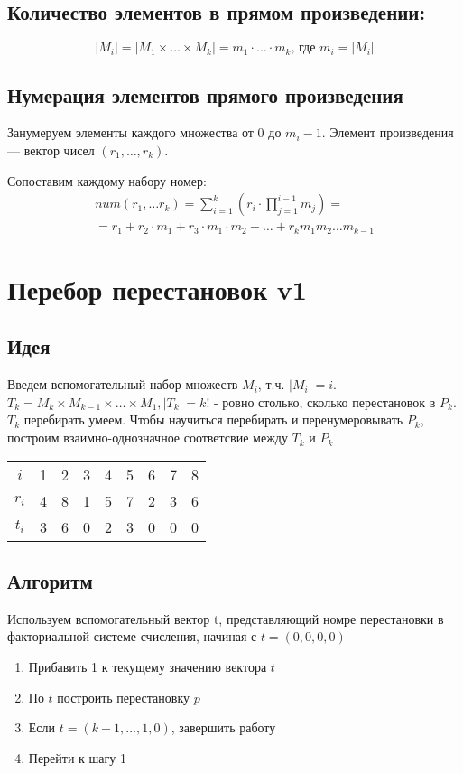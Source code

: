 \documentclass[main]{subfiles}
\begin{document}
\subsection{Количество элементов в прямом произведении:}
\[
    |M_i| = |M_1 \times \ldots \times M_k| = m_1 \cdot \ldots \cdot m_k 
    \text{, где $m_i=|M_i|$}
\]

\subsection{Нумерация элементов прямого произведения}
Занумеруем элементы каждого множества от 0 до $m_i - 1$. Элемент произведения ---
вектор чисел $(r_1, \ldots, r_k)$.

Сопоставим каждому набору номер:
\begin{multline}
    num(r_1, \ldots r_k) = \sum_{i = 1}^{k}\left(r_i \cdot \prod\limits_{j=1}^{i-1}m_j\right) = \\
    = r_1 + r_2 \cdot m_1 + r_3 \cdot m_1 \cdot m_2 + \ldots + r_k m_1 m_2 \ldots m_{k-1}
\end{multline}

\section{Перебор перестановок v1}
\subsection{Идея}
Введем вспомогательный набор множеств $M_i$, т.ч. $|M_i| = i$.
$T_k = M_k \times M_{k-1} \times \ldots \times M_1, |T_k| = k!$ - 
ровно столько, сколько перестановок в $P_k$. $T_k$ перебирать умеем. 
Чтобы научиться перебирать и перенумеровывать $P_k$, построим
взаимно-однозначное соответсвие между $T_k$ и $P_k$

\begin{center}
    \begin{tabular}[c]{*{8}{c|}c}
        $i$   & 1 & 2 & 3 & 4 & 5 & 6 & 7 & 8 \\ \cline{1-9}
        $r_i$ & 4 & 8 & 1 & 5 & 7 & 2 & 3 & 6 \\ \cline{1-9}
        $t_i$ & 3 & 6 & 0 & 2 & 3 & 0 & 0 & 0 
    \end{tabular}
\end{center}

\subsection{Алгоритм}
Используем вспомогательный вектор t, представляющий номре перестановки в
факториальной системе счисления, начиная с $t=(0,0,0,0)$
\begin{enumerate}
    \item Прибавить 1 к текущему значению вектора $t$
    \item По $t$ построить перестановку $p$
    \item Если $t=(k-1, \ldots, 1, 0)$, завершить работу
    \item Перейти к шагу 1
\end{enumerate}
\end{document}
